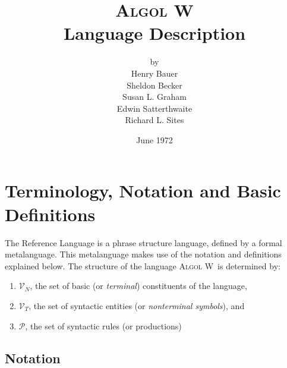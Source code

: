 \documentclass[a4paper]{article}
\def\ALGOLW{\textsc{Algol W}}
\begin{document}
\title{\ALGOLW\\Language Description}
\author{by\\Henry Bauer\\Sheldon Becker\\Susan L. Graham\\Edwin Satterthwaite\\Richard L. Sites}{}
\date{June 1972}

\maketitle

\newpage
\tableofcontents



\newpage
\section{Terminology, Notation and Basic Definitions}

The Reference Language is a phrase structure language, defined by a
formal metalanguage. This metalanguage makes use of the notation and
definitions explained below. The structure of the language \ALGOLW\ is
determined by:

\begin{enumerate}
\item $\mathscr{V}_N$, the set of basic (or \emph{terminal}) constituents of the language,
\item $\mathscr{V}_T$, the set of syntactic entities (or \emph{nonterminal symbols}), and
\item $\mathscr{P}$, the set of syntactic rules (or productions)
\end{enumerate}

\subsection{Notation}
\end{document}

